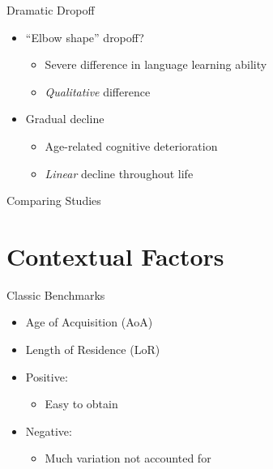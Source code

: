 \documentclass{beamer}
\begin{document}
\begin{frame}{Dramatic Dropoff}
  \begin{itemize}
    \item ``Elbow shape'' dropoff?
    \begin{itemize}
      \item Severe difference in language learning ability
      \item \emph{Qualitative} difference
    \end{itemize}
    \item Gradual decline
    \begin{itemize}
      \item Age-related cognitive deterioration
      \item \emph{Linear} decline throughout life
    \end{itemize}
  \end{itemize}
\end{frame}

\begin{frame}{Comparing Studies} %
\end{frame}

\section{Contextual Factors}

\begin{frame}{Classic Benchmarks} %
    \begin{itemize}
        \item Age of Acquisition (AoA)
        \item Length of Residence (LoR) \\
       \item Positive:
        \begin{itemize}
          \item Easy to obtain
        \end{itemize}
       \item Negative:
        \begin{itemize}
         \item Much variation not accounted for
        \end{itemize}
    \end{itemize}
\end{frame}
\end{document}
